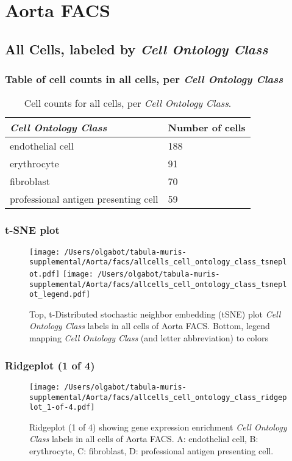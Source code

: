 \clearpage
\section{Aorta FACS}

\subsection{All Cells, labeled by \emph{Cell Ontology Class}}
\subsubsection{Table of cell counts in all cells, per \emph{Cell Ontology Class}}\begin{table}[h]
\centering
\label{my-label}
\begin{tabular}{@{}ll@{}}
\toprule

\emph{Cell Ontology Class}& Number of cells \\ \midrule
endothelial cell & 188 \\

erythrocyte & 91 \\

fibroblast & 70 \\

professional antigen presenting cell & 59 \\
\bottomrule
\end{tabular}
\caption{Cell counts for all cells, per \emph{Cell Ontology Class}.}
\end{table}

\clearpage
\subsubsection{t-SNE plot}
\begin{figure}[h]
\centering
\texttt{[image: /Users/olgabot/tabula-muris-supplemental/Aorta/facs/allcells\_cell\_ontology\_class\_tsneplot.pdf]}
\texttt{[image: /Users/olgabot/tabula-muris-supplemental/Aorta/facs/allcells\_cell\_ontology\_class\_tsneplot\_legend.pdf]}
\caption{Top, t-Distributed stochastic neighbor embedding (tSNE) plot  \emph{Cell Ontology Class} labels in all cells of Aorta FACS. Bottom, legend mapping \emph{Cell Ontology Class} (and letter abbreviation) to colors}
\end{figure}


\clearpage

\subsubsection{Ridgeplot (1 of 4)}
\begin{figure}[h]
\centering
\texttt{[image: /Users/olgabot/tabula-muris-supplemental/Aorta/facs/allcells\_cell\_ontology\_class\_ridgeplot\_1-of-4.pdf]}

\caption{ Ridgeplot (1 of 4)  showing gene expression enrichment \emph{Cell Ontology Class} labels in all cells of Aorta FACS. A: endothelial cell, B: erythrocyte, C: fibroblast, D: professional antigen presenting cell.}
\end{figure}


